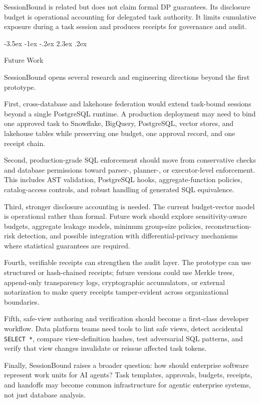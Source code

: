\documentclass[10pt,twocolumn]{article}
\makeatletter
\renewcommand\section{\@startsection{section}{1}{\z@}%
  {-3.5ex \@plus -1ex \@minus -.2ex}%
  {2.3ex \@plus .2ex}%
  {\normalfont\Large\bfseries\raggedright}}
\makeatother
\begin{document}
SessionBound is related but does not claim formal DP guarantees. Its
disclosure budget is operational accounting for delegated task
authority. It limits cumulative exposure during a task session and
produces receipts for governance and audit.


\hypertarget{future-work}{%
\section{Future Work}\label{future-work}}

SessionBound opens several research and engineering directions beyond
the first prototype.

First, cross-database and lakehouse federation would extend
task-bound sessions beyond a single PostgreSQL runtime. A production
deployment may need to bind one approved task to Snowflake, BigQuery,
PostgreSQL, vector stores, and lakehouse tables while preserving one
budget, one approval record, and one receipt chain.

Second, production-grade SQL enforcement should move from
conservative checks and database permissions toward parser-, planner-,
or executor-level enforcement. This includes AST validation, PostgreSQL
hooks, aggregate-function policies, catalog-access controls, and robust
handling of generated SQL equivalence.

Third, stronger disclosure accounting is needed. The current
budget-vector model is operational rather than formal. Future work
should explore sensitivity-aware budgets, aggregate leakage models,
minimum group-size policies, reconstruction-risk detection, and possible
integration with differential-privacy mechanisms where statistical
guarantees are required.

Fourth, verifiable receipts can strengthen the audit layer. The
prototype can use structured or hash-chained receipts; future versions
could use Merkle trees, append-only transparency logs, cryptographic
accumulators, or external notarization to make query receipts
tamper-evident across organizational boundaries.

Fifth, safe-view authoring and verification should become a
first-class developer workflow. Data platform teams need tools to lint
safe views, detect accidental \texttt{SELECT\ *}, compare
view-definition hashes, test adversarial SQL patterns, and verify that
view changes invalidate or reissue affected task tokens.

Finally, SessionBound raises a broader question: how should enterprise
software represent work units for AI agents? Task templates, approvals,
budgets, receipts, and handoffs may become common infrastructure for
agentic enterprise systems, not just database analysis.
\end{document}
